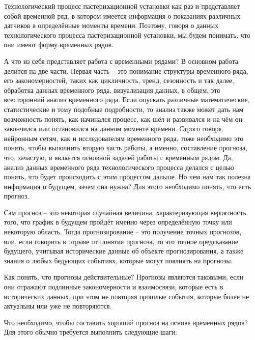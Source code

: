 {  \par \redline Технологический процесс пастеризационной установки как раз и представляет собой временной ряд, в котором имеется информация о показаниях различных датчиков в определённые моменты времени. Поэтому, говоря о данных технологического процесса пастеризационной установки, мы будем понимать, что они имеют форму временных рядов.

  \par \redline А что из себя представляет работа с временными рядами? В основном работа делится на две части. Первая часть {--} это понимание структуры временного ряда, его закономерностей, таких как цикличность, тренд, сезонность и так далее, обработка данных временного ряда, визуализация данных, в общем, это всесторонний анализ временного ряда. Если опускать различные математические, статистические и тому подобные подробности, то анализ также может дать нам возможность понять, как начинался процесс, как шёл и развивался и на чём он закончился или остановился на данном моменте времени.  Строго говоря, нейронным сетям, как и исследователям временного ряда, тоже необходимо это понять, чтобы выполнить вторую часть работы, а именно, составление прогноза, что, зачастую, и является основной задачей работы с временным рядом. Да, анализ данных временного ряда технологического процесса делался с целью понять, что будет происходить с этим процессом дальше. Но чем нам так полезна информация о будущем, зачем она нужна? Для этого необходимо понять, что есть прогноз. 

  \par \redline Сам прогноз {--} это некоторая случайная величина, характеризующая вероятность того, что график в будущем пройдёт именно через определённую точку или некоторую область. Тогда прогнозирование {--} это получение точных прогнозов, или, если говорить в отрыве от понятия прогноза, то это точное предсказание будущего, учитывая исторические данные об объекте прогнозирования, а также знания о любых бедующих событиях, которые могут повлиять на прогнозы. 

  \par \redline Как понять, что прогнозы действительные? Прогнозы являются таковыми, если они отражают подлинные закономерности и взаимосвязи, которые есть в исторических данных, при этом не повторяя прошлые события, которые более не актуальны или уже не повторяются. 

  \par \redline Что необходимо, чтобы составить хороший прогноз на основе временных рядов? Для этого обычно требуется выполнить следующие шаги:

}
